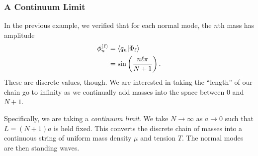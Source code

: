 \documentclass[10pt]{mypackage}
\begin{document}
\subsubsection{A Continuum Limit}%
In the previous example, we verified that for each normal mode, the $n$th mass has amplitude
\begin{align*}
  \phi_{n}^{(\ell)} &= \braket{q_n}{\Phi_{\ell}}\\
                    &= \sin\left(\frac{n\ell \pi}{N+1}\right).
\end{align*}
These are discrete values, though. We are interested in taking the ``length'' of our chain go to infinity as we continually add masses into the space between $0$ and $N+1$.\newline

Specifically, we are taking a \textit{continuum limit}. We take $N\rightarrow\infty$ as $a\rightarrow 0$ such that $L = \left(N+1\right)a$ is held fixed. This converts the discrete chain of masses into a continuous string of uniform mass density $\mu$ and tension $T$. The normal modes are then standing waves.\newline
\end{document}
